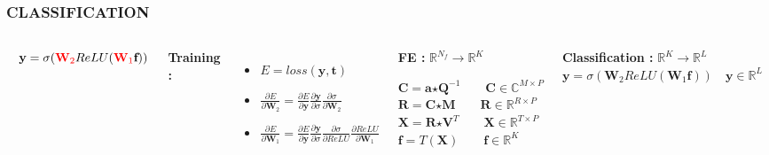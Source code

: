 \documentclass{beamer}
\begin{document}
\begin{frame}
\frametitle{CLASSIFICATION}
\begin{columns}[c]
$\quad \textbf{y} = \sigma({\color{red}\textbf{W}_{2}}ReLU({\color{red}\textbf{W}_{1}}\textbf{f}))$
\bigskip

\noindent \textbf{Training :}
\begin{itemize}
\item $E = loss(\textbf{y}, \textbf{t})$
\item $\frac{\partial E}{\partial \textbf{W}_{2}} = \frac{\partial E}{\partial \textbf{y}}\frac{\partial \textbf{y}}{\partial \sigma}\frac{\partial \sigma}{\partial \textbf{W}_{2}}$
\item $\frac{\partial E}{\partial \textbf{W}_{1}} = \frac{\partial E}{\partial \textbf{y}}\frac{\partial \textbf{y}}{\partial \sigma}\frac{\partial \sigma}{\partial ReLU}\frac{\partial ReLU}{\partial \textbf{W}_{1}}$
\end{itemize}

\begin{block}{\textbf{FE :} $\mathbb{R}^{N_{f}} \rightarrow \mathbb{R}^{K}$}

$\textbf{C} = \textbf{a} \bm{\star} \textbf{Q}^{-1} \qquad \textbf{C} \in \mathbb{C}^{M \times P}$\\
$\textbf{R} = \textbf{C} \bm{\star} \textbf{M} \qquad \textbf{R} \in \mathbb{R}^{R \times P}$\\
$\textbf{X} = \textbf{R} \bm{\star} \textbf{V}^{T} \qquad \textbf{X} \in \mathbb{R}^{T \times P}$\\
$\textbf{f} = T(\textbf{X}) \qquad \textbf{f} \in \mathbb{R}^{K}$\\
\end{block}
\begin{block}{\textbf{Classification :} $\mathbb{R}^{K} \rightarrow \mathbb{R}^{L}$}
$\textbf{y} = \sigma(\textbf{W}_{2}ReLU(\textbf{W}_{1}\textbf{f})) \quad \textbf{y} \in \mathbb{R}^{L}$
\end{block}
\end{columns}
\end{frame}
\end{document}
